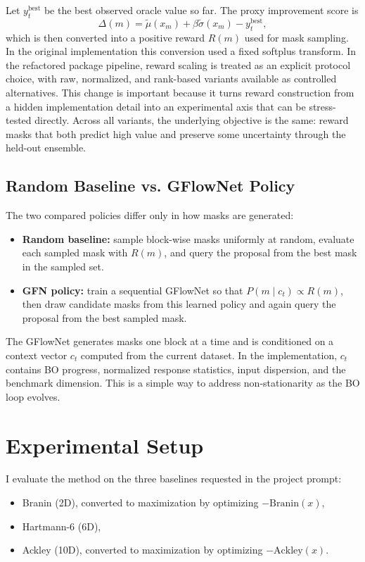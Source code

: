 \documentclass{article}
\begin{document}
Let $y_t^{\mathrm{best}}$ be the best observed oracle value so far. The proxy improvement score is
\[
\Delta(m) = \tilde\mu(x_m) + \beta \tilde\sigma(x_m) - y_t^{\mathrm{best}},
\]
which is then converted into a positive reward $R(m)$ used for mask sampling. In the original implementation this conversion used a fixed softplus transform. In the refactored package pipeline, reward scaling is treated as an explicit protocol choice, with raw, normalized, and rank-based variants available as controlled alternatives. This change is important because it turns reward construction from a hidden implementation detail into an experimental axis that can be stress-tested directly. Across all variants, the underlying objective is the same: reward masks that both predict high value and preserve some uncertainty through the held-out ensemble.

\subsection{Random Baseline vs. GFlowNet Policy}

The two compared policies differ only in how masks are generated:

\begin{itemize}
    \item \textbf{Random baseline:} sample block-wise masks uniformly at random, evaluate each sampled mask with $R(m)$, and query the proposal from the best mask in the sampled set.
    \item \textbf{GFN policy:} train a sequential GFlowNet so that $P(m \mid c_t) \propto R(m)$, then draw candidate masks from this learned policy and again query the proposal from the best sampled mask.
\end{itemize}

The GFlowNet generates masks one block at a time and is conditioned on a context vector $c_t$ computed from the current dataset. In the implementation, $c_t$ contains BO progress, normalized response statistics, input dispersion, and the benchmark dimension. This is a simple way to address non-stationarity as the BO loop evolves.

\section{Experimental Setup}

I evaluate the method on the three baselines requested in the project prompt:

\begin{itemize}
    \item Branin (2D), converted to maximization by optimizing $-\mathrm{Branin}(x)$,
    \item Hartmann-6 (6D),
    \item Ackley (10D), converted to maximization by optimizing $-\mathrm{Ackley}(x)$.
\end{itemize}
\end{document}
